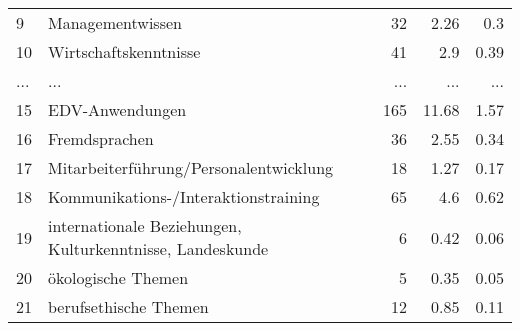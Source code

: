 \begin{longtable}{lXrrr}
        9 & \multicolumn{1}{X}{Managementwissen} & %
          \num{32} &
          \num[round-mode=places,round-precision=2]{2,26} &
          \num[round-mode=places,round-precision=2]{0,3} \\
        10 & \multicolumn{1}{X}{Wirtschaftskenntnisse} & %
          \num{41} &
          \num[round-mode=places,round-precision=2]{2,9} &
          \num[round-mode=places,round-precision=2]{0,39} \\
       ... & ... & ... & ... & ... \\
        15 & \multicolumn{1}{X}{EDV-Anwendungen} & %
          \num{165} &
          \num[round-mode=places,round-precision=2]{11,68} &
          \num[round-mode=places,round-precision=2]{1,57} \\

        16 & \multicolumn{1}{X}{Fremdsprachen} & %
          \num{36} &
          \num[round-mode=places,round-precision=2]{2,55} &
          \num[round-mode=places,round-precision=2]{0,34} \\

        17 & \multicolumn{1}{X}{Mitarbeiterführung/Personalentwicklung} & %
          \num{18} &
          \num[round-mode=places,round-precision=2]{1,27} &
          \num[round-mode=places,round-precision=2]{0,17} \\

        18 & \multicolumn{1}{X}{Kommunikations-/Interaktionstraining} & %
          \num{65} &
          \num[round-mode=places,round-precision=2]{4,6} &
          \num[round-mode=places,round-precision=2]{0,62} \\

        19 & \multicolumn{1}{X}{internationale Beziehungen, Kulturkenntnisse, Landeskunde} & %
          \num{6} &
          \num[round-mode=places,round-precision=2]{0,42} &
          \num[round-mode=places,round-precision=2]{0,06} \\

        20 & \multicolumn{1}{X}{ökologische Themen} & %
          \num{5} &
          \num[round-mode=places,round-precision=2]{0,35} &
          \num[round-mode=places,round-precision=2]{0,05} \\

        21 & \multicolumn{1}{X}{berufsethische Themen} & %
          \num{12} &
          \num[round-mode=places,round-precision=2]{0,85} &
          \num[round-mode=places,round-precision=2]{0,11} \\


\end{longtable}
